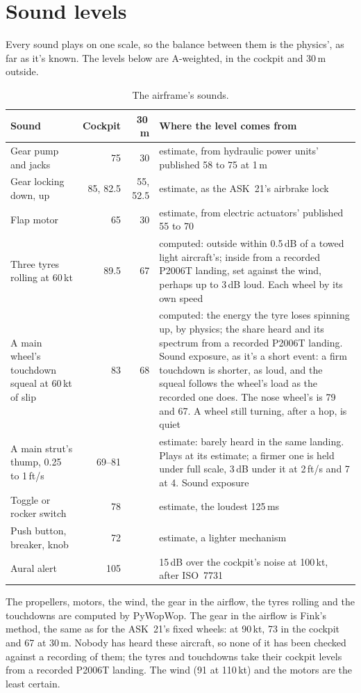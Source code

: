 \documentclass[11pt,a4paper,oneside]{book}
\begin{document}
\chapter{Sound levels}\label{app:sound}
Every sound plays on one scale, so the balance between them is the physics', as far as it's known. The levels below are A-weighted, in the cockpit and 30\,m outside.
\begin{table}[H]\centering\small
\caption{The airframe's sounds.}
\begin{tabularx}{\textwidth}{@{}lrrX@{}}
\toprule
Sound & Cockpit & 30\,m & Where the level comes from \\
\midrule
Gear pump and jacks & 75 & 30 & estimate, from hydraulic power units' published 58 to 75 at 1\,m \\
Gear locking down, up & 85, 82.5 & 55, 52.5 & estimate, as the ASK~21's airbrake lock \\
Flap motor & 65 & 30 & estimate, from electric actuators' published 55 to 70 \\
Three tyres rolling at 60\,kt & 89.5 & 67 & computed: outside within 0.5\,dB of a towed light aircraft's; inside from a recorded P2006T landing, set against the wind, perhaps up to 3\,dB loud. Each wheel by its own speed \\
A main wheel's touchdown squeal at 60\,kt of slip & 83 & 68 & computed: the energy the tyre loses spinning up, by physics; the share heard and its spectrum from a recorded P2006T landing. Sound exposure, as it's a short event: a firm touchdown is shorter, as loud, and the squeal follows the wheel's load as the recorded one does. The nose wheel's is 79 and 67. A wheel still turning, after a hop, is quiet \\
A main strut's thump, 0.25 to 1\,ft/s & 69--81 & & estimate: barely heard in the same landing. Plays at its estimate; a firmer one is held under full scale, 3\,dB under it at 2\,ft/s and 7 at 4. Sound exposure \\
Toggle or rocker switch & 78 & & estimate, the loudest 125\,ms \\
Push button, breaker, knob & 72 & & estimate, a lighter mechanism \\
Aural alert & 105 & & 15\,dB over the cockpit's noise at 100\,kt, after ISO~7731 \\
\bottomrule
\end{tabularx}
\end{table}
The propellers, motors, the wind, the gear in the airflow, the tyres rolling and the touchdowns are computed by PyWopWop. The gear in the airflow is Fink's method, the same as for the ASK~21's fixed wheels: at 90\,kt, 73 in the cockpit and 67 at 30\,m. Nobody has heard these aircraft, so none of it has been checked against a recording of them; the tyres and touchdowns take their cockpit levels from a recorded P2006T landing. The wind (91 at 110\,kt) and the motors are the least certain.
\end{document}

